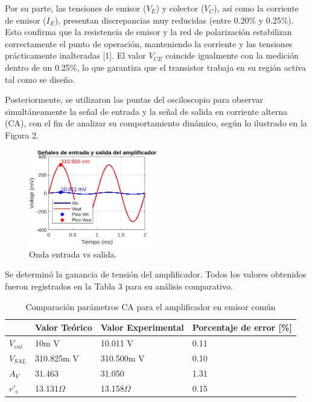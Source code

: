\documentclass[journal]{IEEEtran}
\begin{document}
\par Por su parte, las tensiones de emisor (\( V_E \)) y colector (\( V_C \)), así como la corriente de emisor (\( I_E \)), presentan discrepancias muy reducidas (entre 0.20\% y 0.25\%). Esto confirma que la resistencia de emisor y la red de polarización estabilizan correctamente el punto de operación, manteniendo la corriente y las tensiones prácticamente inalteradas [1]. El valor \( V_{CE} \) coincide igualmente con la medición dentro de un 0.25\%, lo que garantiza que el transistor trabaja en su región activa tal como se diseño.
\par Posteriormente, se utilizaron las puntas del osciloscopio para observar simultáneamente la señal de entrada y la señal de salida en corriente alterna (CA), con el fin de analizar su comportamiento dinámico, según lo ilustrado en la Figura 2. 
\begin{figure}[H]
    \centering
    \includegraphics[width=0.5\textwidth]{Media/onda_entrada_salida.png}
    \caption{Onda entrada vs salida.}
    \label{fig:onda_entrada_salida.}
\end{figure}
\par Se determinó la ganancia de tensión del amplificador. Todos los valores obtenidos fueron registrados en la Tabla 3 para su análisis comparativo.
\begin{table}[h]
    \caption{Comparación parámetros CA para el amplificador en emisor común}
    \centering
    \renewcommand{\arraystretch}{1.2} %
    \begin{tabular}{|l|p{2cm}|p{2cm}|p{2cm}|}
        \hline
        & \textbf{Valor Teórico} & \textbf{Valor Experimental} & \textbf{Porcentaje de error [\%]} \\
        \hline
        \( V_{ent}\) & 10m V   & 10.011 V  & 0.11 \\
        \hline
        \( V_{SAL} \) & 310.825m V    & 310.500m V  & 0.10 \\
        \hline
        \( A_V \) & 31.463 & 31.050 & 1.31 \\
        \hline
        \( r'_e \) & 13.131$\Omega$ & 13.158$\Omega$ & 0.15 \\
        \hline
    \end{tabular}
    \label{tab:parámetrosCA}
\end{table}
\end{document}
